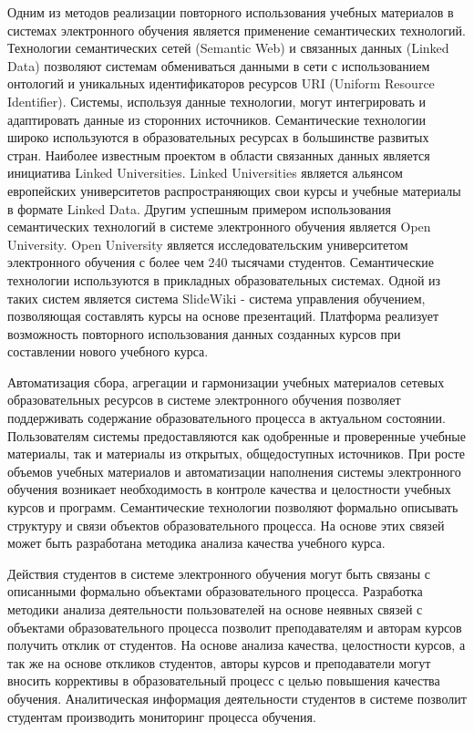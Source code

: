 Одним из методов реализации повторного использования учебных материалов в системах электронного обучения является применение семантических технологий. Технологии семантических сетей (Semantic Web) и связанных данных (Linked Data) позволяют системам обмениваться данными в сети с использованием онтологий и уникальных идентификаторов ресурсов URI (Uniform Resource Identifier). Системы, используя данные технологии, могут интегрировать и адаптировать данные из сторонних источников. Семантические технологии широко используются в образовательных ресурсах в большинстве развитых стран. Наиболее известным проектом в области связанных данных является инициатива Linked Universities. Linked Universities является альянсом европейских университетов распространяющих свои курсы и учебные материалы в формате Linked Data. Другим успешным примером использования семантических технологий в системе электронного обучения является Open University. Open University является исследовательским университетом электронного обучения с более чем 240 тысячами студентов. Семантические технологии используются в прикладных образовательных системах. Одной из таких систем является система SlideWiki - система управления обучением, позволяющая составлять курсы на основе презентаций. Платформа реализует возможность повторного использования данных созданных курсов при составлении нового учебного курса.

Автоматизация сбора, агрегации и гармонизации учебных материалов сетевых образовательных ресурсов в системе электронного обучения позволяет поддерживать содержание образовательного процесса в актуальном состоянии. Пользователям системы предоставляются как одобренные и проверенные учебные материалы, так и материалы из открытых, общедоступных источников. При росте объемов учебных материалов и автоматизации наполнения системы электронного обучения возникает необходимость в контроле качества и целостности учебных курсов и программ. Семантические технологии позволяют формально описывать структуру и связи объектов образовательного процесса. На основе этих связей может быть разработана методика анализа качества учебного курса. 

Действия студентов в системе электронного обучения могут быть связаны с описанными формально объектами образовательного процесса. Разработка методики анализа деятельности пользователей на основе неявных связей с объектами образовательного процесса позволит преподавателям и авторам курсов получить отклик от студентов. На основе анализа качества, целостности курсов, а так же на основе откликов студентов, авторы курсов и преподаватели могут вносить коррективы в образовательный процесс с целью повышения качества обучения. Аналитическая информация деятельности студентов в системе позволит студентам производить мониторинг процесса обучения.     

